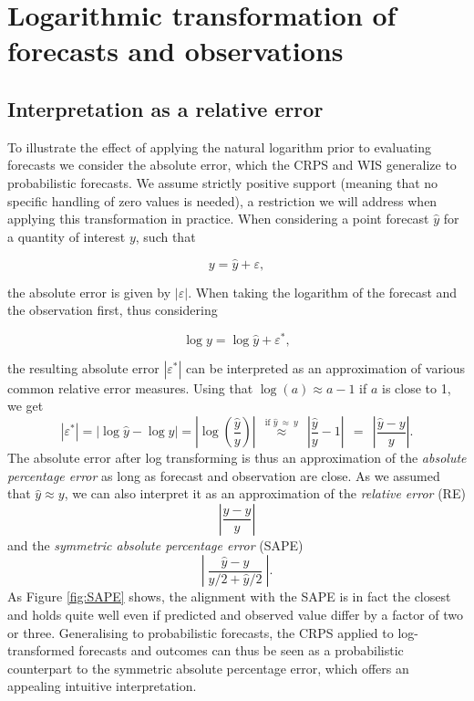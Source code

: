 \documentclass{article}
\begin{document}
\section{Logarithmic transformation of forecasts and observations}
\label{sec:methods}

\subsection{Interpretation as a relative error}
\label{sec:methods:relative}

To illustrate the effect of applying the natural logarithm prior to evaluating forecasts we consider the absolute error, which the CRPS and WIS generalize to probabilistic forecasts. We assume strictly positive support (meaning that no specific handling of zero values is needed), a restriction we will address when applying this transformation in practice. When considering a point forecast $\hat{y}$ for a quantity of interest $y$, such that 
%
\begin{linenomath*}
\begin{equation*}
y = \hat{y} + \varepsilon,
\end{equation*}
\end{linenomath*}
the absolute error is given by $|\varepsilon|$. When taking the logarithm of the forecast and the observation first, thus considering 
\begin{linenomath*}
\begin{equation*}
\log y = \log \hat{y} + \varepsilon^*,
\end{equation*}
\end{linenomath*}
the resulting absolute error $\left|\varepsilon^*\right|$ can be interpreted as an approximation of various common relative error measures. Using that $\log(a) \approx a - 1$ if $a$ is close to 1, we get
$$
|\varepsilon^*| = |\log \hat{y} - \log y| = \left|\log\left(\frac{\hat{y}}{y}\right) \right| \ \ \stackrel{\text{if } \hat{y} \ \approx \ y}{\approx} \ \ \left| \frac{\hat{y}}{y} - 1 \right| \ \ = \ \ \left| \frac{\hat{y} - y}{y} \right|.
$$
The absolute error after log transforming is thus an approximation of the \textit{absolute percentage error} \citep[APE,][]{gneitingMakingEvaluatingPoint2011a} as long as forecast and observation are close. As we assumed that $\hat{y} \approx y$, we can also interpret it as an approximation of the \textit{relative error} (RE)
$$
\left| \frac{\hat{y} - y}{\hat{y}} \right|
$$
and the \textit{symmetric absolute percentage error} (SAPE)
$$
\left| \ \frac{\hat{y} - y}{y/2 + \hat{y}/2} \ \right|.
$$
As Figure \ref{fig:SAPE} shows, the alignment with the SAPE is in fact the closest and holds quite well even if predicted and observed value differ by a factor of two or three. Generalising to probabilistic forecasts, the CRPS applied to log-transformed forecasts and outcomes can thus be seen as a probabilistic counterpart to the symmetric absolute percentage error, which offers an appealing intuitive interpretation.
\end{document}
